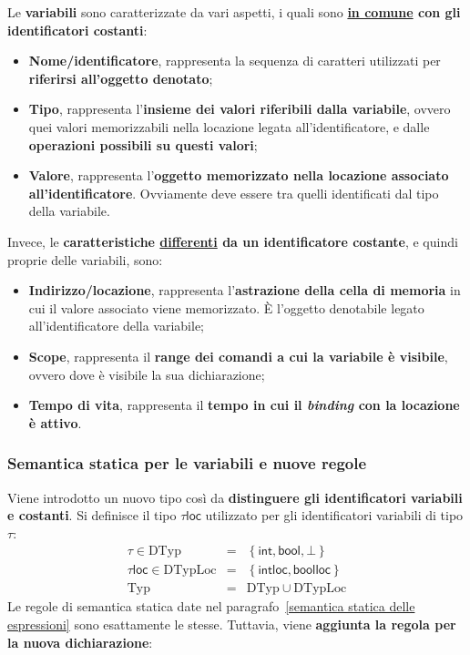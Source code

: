 \documentclass[a4paper]{article}
\begin{document}
	Le \textcolor{Red3}{\textbf{variabili}} sono caratterizzate da vari aspetti, i quali sono \textbf{\underline{in comune} con gli identificatori costanti}:
	\begin{itemize}
		\item \textbf{Nome/identificatore}, rappresenta la sequenza di caratteri utilizzati per \textbf{riferirsi all'oggetto denotato};
		
		\item \textbf{Tipo}, rappresenta l'\textbf{insieme dei valori riferibili dalla variabile}, ovvero quei valori memorizzabili nella locazione legata all'identificatore, e dalle \textbf{operazioni possibili su questi valori};
		
		\item \textbf{Valore}, rappresenta l'\textbf{oggetto memorizzato nella locazione associato all'identificatore}. Ovviamente deve essere tra quelli identificati dal tipo della variabile.
	\end{itemize}
	Invece, le \textbf{caratteristiche \underline{differenti} da un identificatore costante}, e quindi proprie delle variabili, sono:
	\begin{itemize}
		\item \textbf{Indirizzo/locazione}, rappresenta l'\textbf{astrazione della cella di memoria} in cui il valore associato viene memorizzato. È l'oggetto denotabile legato all'identificatore della variabile;
		
		\item \textbf{Scope}, rappresenta il \textbf{range dei comandi a cui la variabile è visibile}, ovvero dove è visibile la sua dichiarazione;
		
		\item \textbf{Tempo di vita}, rappresenta il \textbf{tempo in cui il \emph{binding} con la locazione è attivo}.
	\end{itemize}\newpage
	
	\subsubsection{Semantica statica per le variabili e nuove regole}
	
	Viene introdotto un nuovo tipo così da \textbf{distinguere gli identificatori variabili e costanti}. Si definisce il tipo $\mathsf{\tau loc}$ utilizzato per gli identificatori variabili di tipo $\tau$:
	\begin{equation*}
		\begin{array}{rll}
			\tau \in \mathrm{DTyp} & = & \left\{\mathsf{int}, \mathsf{bool}, \bot\right\} \\
			\mathsf{\tau loc} \in \mathrm{DTypLoc} & = & \left\{\mathsf{intloc}, \mathsf{boolloc}\right\} \\
			\mathrm{Typ} & = & \mathrm{DTyp} \cup \mathrm{DTypLoc}
		\end{array}
	\end{equation*}
	Le regole di semantica statica date nel paragrafo~\ref{semantica statica delle espressioni} sono esattamente le stesse. Tuttavia, viene \textbf{aggiunta la regola per la nuova dichiarazione}:
	
\end{document}
